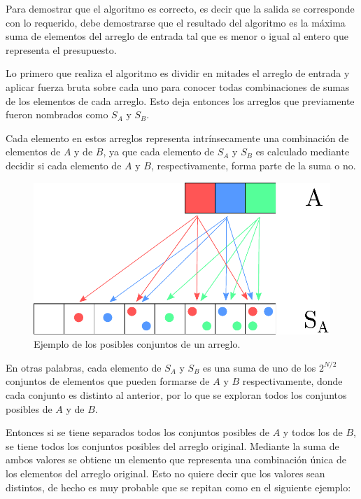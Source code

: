 Para demostrar que el algoritmo es correcto, es decir que la salida se
corresponde con lo requerido, debe demostrarse que el resultado del algoritmo es
la máxima suma de elementos del arreglo de entrada tal que es menor o igual al
entero que representa el presupuesto.

Lo primero que realiza el algoritmo es dividir en mitades el arreglo de entrada
y aplicar fuerza bruta sobre cada uno para conocer todas combinaciones de sumas
de los elementos de cada arreglo. Esto deja entonces los arreglos que
previamente fueron nombrados como $S_A$ y $S_B$.

Cada elemento en estos arreglos representa intrínsecamente una combinación de
elementos de $A$ y de $B$, ya que cada elemento de $S_A$ y $S_B$ es calculado
mediante decidir si cada elemento de $A$ y $B$, respectivamente, forma parte de
la suma o no.

\begin{figure}[H]
	\centering
	\includegraphics[scale=0.6]{imagenes/ex1_example1.pdf}
	\caption{Ejemplo de los posibles conjuntos de un arreglo.}
	\label{ej1:fig:combinations}
\end{figure}

En otras palabras, cada elemento de $S_A$ y $S_B$ es una suma de uno de los
$2^{N / 2}$ conjuntos de elementos que pueden formarse de $A$ y $B$
respectivamente, donde cada conjunto es distinto al anterior, por lo que se
exploran todos los conjuntos posibles de $A$ y de $B$.

Entonces si se tiene separados todos los conjuntos posibles de $A$ y todos los
de $B$, se tiene todos los conjuntos posibles del arreglo original. Mediante la
suma de ambos valores se obtiene un elemento que representa una combinación
única de los elementos del arreglo original. Esto no quiere decir que los
valores sean distintos, de hecho es muy probable que se repitan como en el
siguiente ejemplo:

